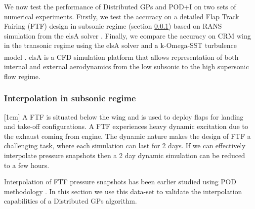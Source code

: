 We now test the performance of Distributed GPs and POD+I on two sets of numerical experiments. Firstly, we test the accuracy on a detailed Flap Track Fairing (FTF) design \cite{bosco2016nonlinear} in subsonic regime (section \ref{subSec:elsAResults}) based on RANS simulation from the elsA solver \cite{cambier2008status}. Finally, we compare the accuracy on CRM wing in the transonic regime using the elsA solver and a k-Omega-SST turbulence model \cite{vassberg2014summary}. elsA\textsuperscript{\textregistered} \cite{cambier2008status} is a CFD simulation platform that allows representation of both internal and external aerodynamics from the low subsonic to the high supersonic flow regime.  

\subsubsection{Interpolation in subsonic regime}\label{subSec:elsAResults}
[1cm]
A FTF is situated below the wing and is used to deploy flaps for landing and take-off configurations. A FTF experiences heavy dynamic excitation due to the exhaust coming from engine. The dynamic nature makes the design of FTF a challenging task, where each simulation can last for 2 days. If we can effectively interpolate pressure snapshots then a 2 day dynamic simulation can be reduced to a few hours. 

Interpolation of FTF pressure snapshots has been earlier studied using POD methodology \cite{bosco2016nonlinear}. In this section we use this data-set to validate the interpolation capabilities of a Distributed GPs algorithm. 


